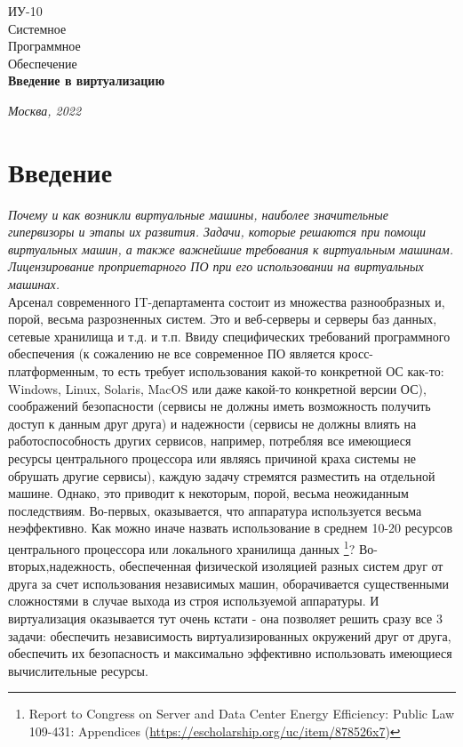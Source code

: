 \documentclass[14pt, a4paper]{article}
\begin{document}
\begin{titlepage}
    \topmargin=216pt
    \newpage
    \hangindent=0.7cm
    \huge ИУ-10\\
    Системное\\
    Программное\\
    Обеспечение\\
    \textbf{Введение в виртуализацию}

    \vspace{10cm}

    \begin{center}
        \small\textit{Москва, 2022}
    \end{center}
\end{titlepage}

\section*{Введение}

\textit{Почему и как возникли виртуальные машины, наиболее
значительные гипервизоры и этапы их развития. Задачи,
которые решаются при помощи виртуальных машин, а также
важнейшие требования к виртуальным машинам.
Лицензирование проприетарного ПО при его использовании на
виртуальных машинах.}\\

Арсенал современного IT-департамента состоит из множества разнообразных и,
порой, весьма разрозненных систем. Это и веб-серверы и серверы баз данных,
сетевые хранилища и т.д. и т.п. Ввиду специфических требований программного
обеспечения (к сожалению не все современное ПО является кросс-платформенным, то
есть требует использования какой-то конкретной ОС как-то: Windows, Linux, Solaris,
MacOS или даже какой-то конкретной версии ОС), соображений безопасности
(сервисы не должны иметь возможность получить доступ к данным друг друга) и
надежности (сервисы не должны влиять на работоспособность других сервисов,
например, потребляя все имеющиеся ресурсы центрального процессора или являясь
причиной краха системы не обрушать другие сервисы), каждую задачу стремятся
разместить на отдельной машине. Однако, это приводит к некоторым, порой, весьма
неожиданным последствиям. Во-первых, оказывается, что аппаратура используется
весьма неэффективно. Как можно иначе назвать использование в среднем 10-20%
ресурсов центрального процессора или локального хранилища данных \footnote{Report 
to Congress on Server and Data Center Energy Efficiency: Public Law 109-431: Appendices 
(\href{https://escholarship.org/uc/item/878526x7}{https://escholarship.org/uc/item/878526x7})}? 
Во-вторых,надежность, обеспеченная физической изоляцией разных систем друг от друга за счет
использования независимых машин, оборачивается существенными сложностями в
случае выхода из строя используемой аппаратуры. И виртуализация оказывается тут
очень кстати - она позволяет решить сразу все 3 задачи: обеспечить независимость
виртуализированных окружений друг от друга, обеспечить их безопасность и
максимально эффективно использовать имеющиеся вычислительные ресурсы.
\end{document}
